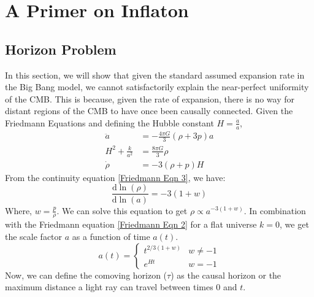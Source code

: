 \documentclass[aps,prd,reprint,preprintnumbers,showpacs,floatfix,nofootinbib,superscript address]{revtex4-2}
\newcommand{\wb}[1]{{\color[RGB]{255,0,0}{\textbf{\textit{[WB: #1]}}}}}
\newcommand{\pcs}[1]{{\color[RGB]{0,100,0}{\textbf{\textit{[PCS: #1]}}}}}
\begin{document}

\appendix

\section{A Primer on Inflaton}\label{The need for Inflation}

\subsection{Horizon Problem} \label{Horizon Problem}
In this section, we will show that given the standard assumed expansion rate in the Big Bang model, we cannot satisfactorily explain the near-perfect uniformity of the CMB. This is because, given the rate of expansion, there is no way for distant regions of the CMB to have once been causally connected.
Given the Friedmann Equations and defining the Hubble constant $H = \frac{\dot{a}}{a}$,
\begin{align}    
    \ddot{a} &= -\frac{4\pi G}{3} (\rho + 3p)a \label{Friedmann Eqn 1} \\
    H^2 + \frac{k}{a^2} &= \frac{8 \pi G}{3} \rho \label{Friedmann Eqn 2} \\
    \dot{\rho} &= -3(\rho + p)H \label{Friedmann Eqn 3}
\end{align}
From the continuity equation \cref{Friedmann Eqn 3}, we have:
\begin{equation} \label{4}
    \frac{\mathrm{d}  \ln(\rho)}{\mathrm{d} \ln(a)} = -3(1+w)
\end{equation}
Where, $w = \frac{p}{\rho}$. We can solve this equation to get $\rho \propto a^{-3(1+w)}$. In combination with the Friedmann equation \cref{Friedmann Eqn 2} for a flat universe $k = 0$, we get the scale factor $a$ as a function of time $a(t)$.
\begin{equation}    \label{5}
    a(t) = \begin{cases}
        t^{2/3(1+w)} & w \neq -1 \\
        e^{Ht} & w = -1
    \end{cases}
\end{equation}
Now, we can define the comoving horizon ($\tau$) as the causal horizon or the maximum distance a light ray can travel between times 0 and $t$.
\end{document}
